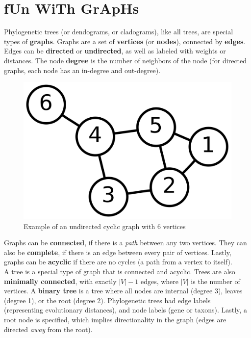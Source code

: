 \documentclass[12pt]{article}
\begin{document}
\section{fUn WiTh GrApHs}
Phylogenetic trees (or dendograms, or cladograms), like all trees, are special types of \textbf{graphs}. Graphs are a set of \textbf{vertices} (or \textbf{nodes}),   connected by \textbf{edges}. Edges can be \textbf{directed} or \textbf{undirected}, as well as labeled with weights or distances. The node \textbf{degree} is the number of neighbors of the node (for directed graphs, each node has an in-degree and out-degree).
\begin{figure}[h]
    \centering
    \includegraphics[width=.4\linewidth]{graph.png}
    \caption{Example of an undirected cyclic graph with 6 vertices}
    \label{fig:graph}
\end{figure}
Graphs can be \textbf{connected}, if there is a \textit{path} between any two vertices. They can also be \textbf{complete}, if there is an edge between every pair of vertices. Lastly, graphs can be \textbf{acyclic} if there are no cycles (a path from a vertex to itself).\\[10pt]
A tree is a special type of graph that is connected and acyclic. Trees are also \textbf{minimally connected}, with exactly $|V| - 1$ edges, where $|V|$ is the number of vertices.  A \textbf{binary tree} is a tree where all nodes are internal (degree 3), leaves (degree 1), or the root (degree 2). Phylogenetic trees had edge labels (representing evolutionary distances), and node labels (gene or taxons). Lastly, a root node is specified, which implies directionality in the graph (edges are directed \textit{away} from the root).
\end{document}

